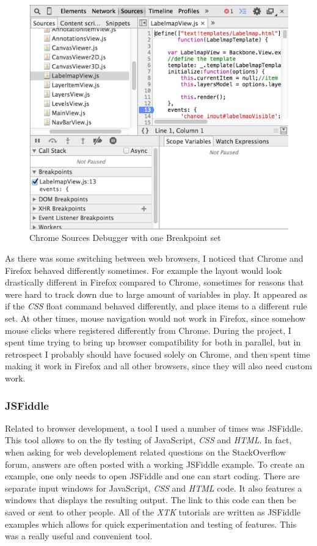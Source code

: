 \documentclass[a4paper,11pt,twoside]{article}
\begin{document}
\begin{figure}[ht!]
\centering
\includegraphics[width=140mm]{graphics/chromeDebugger_01.png}
\caption{Chrome Sources Debugger with one Breakpoint set}
\label{fig:UIdesign1}
\end{figure}



As there was some switching between web browsers, I noticed that Chrome and Firefox behaved differently sometimes. For example the layout would look drastically different in Firefox compared to Chrome, sometimes for reasons that were hard to track down due to large amount of variables in play. It appeared as if the \textit{CSS} float command behaved differently, and place items to a different rule set. At other times, mouse navigation would not work in Firefox, since somehow mouse clicks where registered differently from Chrome. During the project, I spent time trying to bring up browser compatibility for both in parallel, but in retrospect I probably should have focused solely on Chrome, and then spent time making it work in Firefox and all other browsers, since they will also need custom work.


\subsubsection{JSFiddle}

Related to browser development, a tool I used a number of times was JSFiddle. This tool allows to on the fly testing of JavaScript, \textit{CSS} and \textit{HTML}. In fact, when asking for web developlement related questions on the StackOverflow forum, answers are often posted with a working JSFiddle example. To create an example, one only needs to open JSFiddle and one can start coding. There are separate input windows for JavaScript, \textit{CSS} and \textit{HTML} code. It also features a windows that displays the resulting output. The link to this code can then be saved or sent to other people. All of the \textit{XTK} tutorials are written as JSFiddle examples which allows for quick experimentation and testing of features. This was a really useful and convenient tool. 
\end{document}
